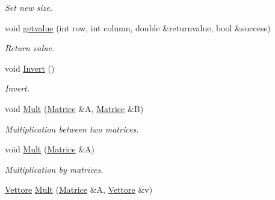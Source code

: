 \begin{DoxyCompactItemize}
\begin{DoxyCompactList}\small\item\em \-Set new size. \end{DoxyCompactList}\item 
\hypertarget{classMatrice_a2b7ffed3a15b7b2ff089b751c3588b4a}{void \hyperlink{classMatrice_a2b7ffed3a15b7b2ff089b751c3588b4a}{getvalue} (int row, int column, double \&returnvalue, bool \&success)}\label{classMatrice_a2b7ffed3a15b7b2ff089b751c3588b4a}

\begin{DoxyCompactList}\small\item\em \-Return value. \end{DoxyCompactList}\item 
\hypertarget{classMatrice_acd68476b8afc6a2dcfb8663ead8b39cd}{void \hyperlink{classMatrice_acd68476b8afc6a2dcfb8663ead8b39cd}{\-Invert} ()}\label{classMatrice_acd68476b8afc6a2dcfb8663ead8b39cd}

\begin{DoxyCompactList}\small\item\em \-Invert. \end{DoxyCompactList}\item 
\hypertarget{classMatrice_abcf6a7d18ac795ba9ae4f2d0af5fd983}{void \hyperlink{classMatrice_abcf6a7d18ac795ba9ae4f2d0af5fd983}{\-Mult} (\hyperlink{classMatrice}{\-Matrice} \&\-A, \hyperlink{classMatrice}{\-Matrice} \&\-B)}\label{classMatrice_abcf6a7d18ac795ba9ae4f2d0af5fd983}

\begin{DoxyCompactList}\small\item\em \-Multiplication between two matrices. \end{DoxyCompactList}\item 
\hypertarget{classMatrice_a52a3ee1bffb7d482d9bbf526e55855ac}{void \hyperlink{classMatrice_a52a3ee1bffb7d482d9bbf526e55855ac}{\-Mult} (\hyperlink{classMatrice}{\-Matrice} \&\-A)}\label{classMatrice_a52a3ee1bffb7d482d9bbf526e55855ac}

\begin{DoxyCompactList}\small\item\em \-Multiplication by matrices. \end{DoxyCompactList}\item 
\hypertarget{classMatrice_a59cbe4933e70b969b4eed6027637d08f}{\hyperlink{classVettore}{\-Vettore} \hyperlink{classMatrice_a59cbe4933e70b969b4eed6027637d08f}{\-Mult} (\hyperlink{classMatrice}{\-Matrice} \&\-A, \hyperlink{classVettore}{\-Vettore} \&v)}\label{classMatrice_a59cbe4933e70b969b4eed6027637d08f}


\end{DoxyCompactItemize}
